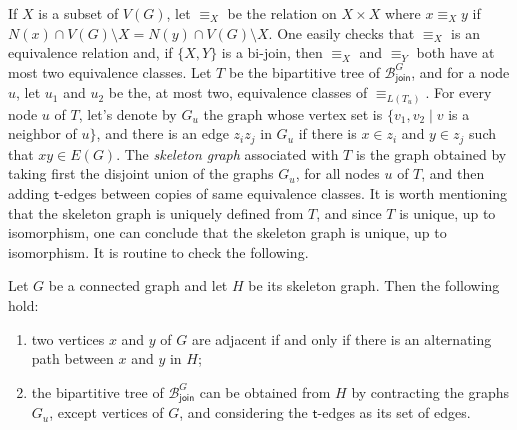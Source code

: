 \documentclass{lmcs} %
\newcommand{\joinSet}{\ensuremath{\mathcal{B}_\mathsf{join}^G}}
\begin{document}
If $X$ is a subset of $V(G)$, let $\equiv_X$ be the relation on $X\times X$ where $x\equiv_X y$ if $N(x)\cap V(G)\setminus X = N(y)\cap V(G)\setminus X$. One
easily checks that $\equiv_X$ is an equivalence relation and, if $\{X,Y\}$ is a bi-join, then $\equiv_X$ and $\equiv_Y$ both have at most two equivalence
classes. Let $T$ be the bipartitive tree of $\joinSet$, and for a node $u$, let $u_1$ and $u_2$ be the, at most two, equivalence classes of
$\equiv_{L(T_u)}$. For every node $u$ of $T$, let's denote by $G_u$ the graph whose vertex set is $\{v_1,v_2\mid v$ is a neighbor of $u\}$, and there is an edge
$z_iz_j$ in $G_u$ if there is $x\in z_i$ and $y\in z_j$ such that $xy\in E(G)$. The \emph{skeleton graph} associated with $T$ is the graph obtained by taking
first the disjoint union of the graphs $G_u$, for all nodes $u$ of $T$, and then adding $\textsf{t}$-edges between copies of same equivalence classes. It is
worth mentioning that the skeleton graph is uniquely defined from $T$, and since $T$ is unique, up to isomorphism, one can conclude that the skeleton graph is
unique, up to isomorphism. It is routine to check the following.

\begin{lemC} Let $G$ be a connected graph and let $H$ be its skeleton graph. Then the following hold:
  \begin{enumerate}
  \item two vertices $x$ and $y$ of $G$ are adjacent if and only if there is an alternating path between $x$ and $y$ in $H$;
  \item the bipartitive tree of $\joinSet$ can be obtained from $H$ by contracting the graphs $G_u$, except vertices of $G$, and considering the
    $\mathsf{t}$-edges as its set of edges.
  \end{enumerate}
\end{lemC}
\end{document}
